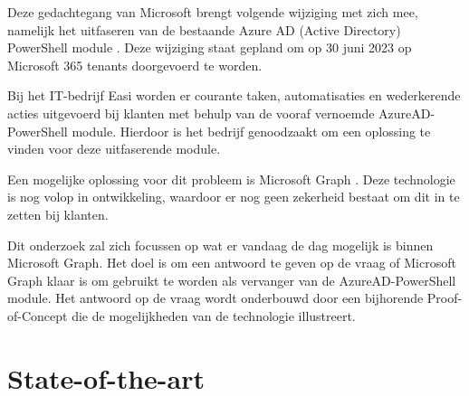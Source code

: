 Deze gedachtegang van Microsoft brengt volgende wijziging met zich mee, namelijk het uitfaseren van de bestaande Azure AD (Active Directory) PowerShell module \autocite{Sahay2022}. Deze wijziging staat gepland om op 30 juni 2023 op Microsoft 365 tenants doorgevoerd te worden.

Bij het IT-bedrijf Easi worden er courante taken, automatisaties en wederkerende acties uitgevoerd bij klanten met behulp van de vooraf vernoemde AzureAD-PowerShell module. Hierdoor is het bedrijf genoodzaakt om een oplossing te vinden voor deze uitfaserende module.

Een mogelijke oplossing voor dit probleem is Microsoft Graph \autocite{Microsoft2023}. Deze technologie is nog volop in ontwikkeling, waardoor er nog geen zekerheid bestaat om dit in te zetten bij klanten.

Dit onderzoek zal zich focussen op wat er vandaag de dag mogelijk is binnen Microsoft Graph. Het doel is om een antwoord te geven op de vraag of Microsoft Graph klaar is om gebruikt te worden als vervanger van de AzureAD-PowerShell module. Het antwoord op de vraag wordt onderbouwd door een bijhorende Proof-of-Concept die de mogelijkheden van de technologie illustreert.



\section{State-of-the-art}%
\label{sec:state-of-the-art}

